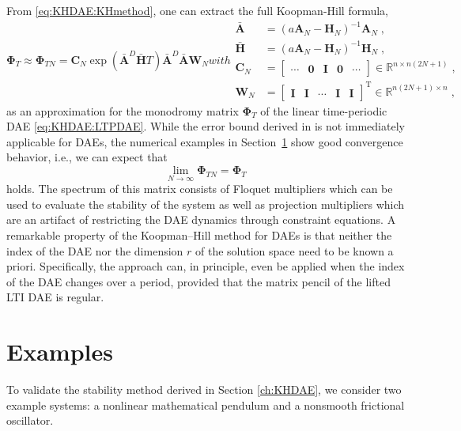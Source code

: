 \documentclass[a4paper, nonatbib, 3p, twocolumn]{elsarticle}
\theoremstyle{plain}
\theoremstyle{definition}
\theoremstyle{remark}
\newcommand{\mo}{\vPh_T}
\newcommand{\moN}{\vPh_{TN}}
\newcommand{\T}{^{\mathop{\mathrm{T}}}}
\newcommand{\vPh}{\mathbf \Phi}
\newcommand{\vA}{\mathbf A}
\newcommand{\vC}{\mathbf C}
\newcommand{\vH}{\mathbf H}
\newcommand{\vI}{\mathbf I}
\newcommand{\vW}{\mathbf W}
\begin{document}
From \eqref{eq:KHDAE:KHmethod}, one can extract the full Koopman-Hill formula,
\begin{subequations}\label{eq:abstract:mainFormula}
\begin{equation}
	\mo\approx\moN = \vC_N \exp\left( \bar{\vA}^D \bar{\vH} T \right) \bar{\vA} ^D \bar{\vA}\vW_N
\end{equation}
with
\begin{align}
	\bar{\vA} &= (a\vA_N-\vH_N)^{-1}\vA_N \;, \\
    \bar{\vH} &= (a\vA_N-\vH_N)^{-1}\vH_N \;, \\
    \vC_N &= \begin{bmatrix}
        \cdots&\!\!\!\mathbf{0}&\vI&\mathbf{0}\!\!\!&\cdots
    \end{bmatrix}\in\mathbb{R}^{n\times n(2N+1)} \;, \\
    \vW_N &= \begin{bmatrix}
        \vI&\vI&\cdots&\vI&\vI
    \end{bmatrix}\T \in \mathbb{R}^{n(2N+1) \times n}\;,
\end{align}
\end{subequations}
as an approximation for the monodromy matrix $\mo$ of the linear time-periodic DAE \eqref{eq:KHDAE:LTPDAE}.
While the error bound derived in \cite{Bayer2025} is not immediately applicable for DAEs, the numerical examples in Section~\ref{ch:Examples} show good convergence behavior, i.e., we can expect that
\begin{equation}
	\lim_{N \to \infty} \moN = \mo
\end{equation}
holds.
The spectrum of this matrix consists of Floquet multipliers which can be used to evaluate the stability of the system as well as projection multipliers which are an artifact of restricting the DAE dynamics through constraint equations.
A remarkable property of the Koopman--Hill method for DAEs is that neither the index of the DAE nor the dimension $r$ of the solution space need to be known a priori. Specifically, the approach can, in principle, even be applied when the index of the DAE changes over a period, provided that the matrix pencil of the lifted LTI DAE is regular.

\section{Examples}\label{ch:Examples}
To validate the stability method derived in Section \ref{ch:KHDAE}, we consider two example systems: a nonlinear mathematical pendulum and a nonsmooth frictional oscillator.
\end{document}
